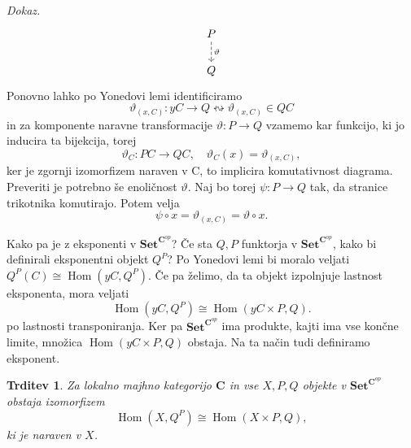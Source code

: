 \documentclass[12pt,a4paper]{book}
\theoremstyle{definition}
\theoremstyle{plain}
\newtheorem{trditev}[definicija]{Trditev}
\newenvironment{dokaz}{\emph{Dokaz.}\ }{\hspace{\fill}{$\Box$}}
\theoremstyle{definition}
\theoremstyle{remark}
\newcommand{\cat}[1]{\textbf{#1}}
\DeclareMathOperator{\Hom}{Hom}
\newcommand{\predsnop}[1]{\cat{Set}^{\cat{#1}^{op}}}
\begin{document}
\begin{dokaz}
$$\begin{tikzcd}
& P \ar[d, dashed, "\vartheta"] & \\
& Q &
\end{tikzcd} $$
Ponovno lahko po Yonedovi lemi identificiramo 
$$\vartheta_{(x,C)}: yC \to Q \leftrightsquigarrow \vartheta_{(x,C)} \in QC$$
in za komponente naravne transformacije $\vartheta : P \to Q$ vzamemo kar funkcijo, ki jo inducira ta bijekcija, torej 
$$\vartheta_C : PC \to QC, \quad \vartheta_C(x) = \vartheta_{(x,C)},$$
ker je zgornji izomorfizem naraven v C, to implicira komutativnost diagrama. Preveriti je potrebno še enoličnost $\vartheta$. Naj bo torej $\psi : P \to Q$ tak, da stranice trikotnika komutirajo. Potem velja 
$$\psi \circ x = \vartheta_{(x,C)} = \vartheta \circ x.$$
\end{dokaz}

Kako pa je z eksponenti v $\cat{Set}^{\cat{C}^{op}}$? Če sta $Q,P$ funktorja v $\predsnop{C}$, kako bi definirali eksponentni objekt $Q^P$? Po Yonedovi lemi bi moralo veljati $Q^P(C) \cong \Hom(yC, Q^P)$. Če pa želimo, da ta objekt izpolnjuje lastnost eksponenta, mora veljati
\begin{equation} \label{eq eksp}
\Hom(yC,Q^P) \cong \Hom(yC \times P, Q).
\end{equation}
po lastnosti transponiranja. Ker pa $\predsnop{C}$ ima produkte, kajti ima vse končne limite, množica $\Hom(yC \times P, Q)$ obstaja. Na ta način tudi definiramo eksponent.

\begin{trditev} \label{trditev 3.6}
Za lokalno majhno kategorijo $\cat{C}$ in vse $X,P,Q$ objekte v $\predsnop{C}$ obstaja izomorfizem
$$\Hom(X,Q^P) \cong \Hom(X \times P, Q),$$
ki je naraven v $X$.
\end{trditev}
\end{document}
